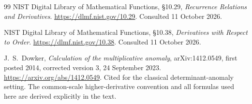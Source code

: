 \begin{thebibliography}{99}
NIST Digital Library of Mathematical Functions,
\S10.29, \emph{Recurrence Relations and Derivatives}.
\url{https://dlmf.nist.gov/10.29}. Consulted 11 October 2026.

NIST Digital Library of Mathematical Functions,
\S10.38, \emph{Derivatives with Respect to Order}.
\url{https://dlmf.nist.gov/10.38}. Consulted 11 October 2026.

J.~S.~Dowker, \emph{Calculation of the multiplicative anomaly},
arXiv:1412.0549, first posted 2014, corrected version 3,
24 September 2023.
\url{https://arxiv.org/abs/1412.0549}.
Cited for the classical determinant-anomaly setting. The common-scale
higher-derivative convention and all formulas used here are derived
explicitly in the text.
\end{thebibliography}
\endgroup

